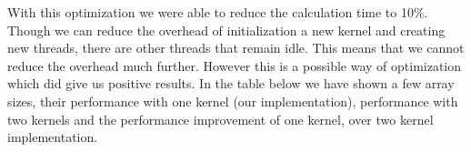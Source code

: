 \documentclass[10pt]{article}
\begin{document}
\begin{multicols}{2}
  With this optimization we were able to reduce the calculation time to 10\%.
  Though we can reduce the overhead of initialization a new kernel and creating new threads, there are other threads that remain idle.
  This means that we cannot reduce the overhead much further.
  However this is a possible way of optimization which did give us positive results.
  In the table below we have shown a few array sizes, their performance with one kernel (our implementation), performance with two kernels \cite{michael} and the performance improvement of one kernel, over two kernel implementation.



\end{multicols}
\end{document}
